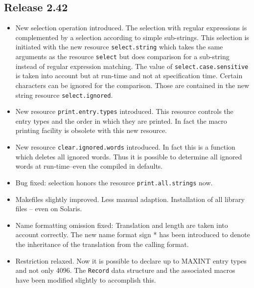 \documentclass[11pt,a4paper]{scrartcl}
\newcommand\rsc[1]{\texttt{#1}}
\newenvironment{Release}[2]{%
  \def\tmp{#2}%
  \section*{Release #1 \ifx\tmp\empty\else{\normalsize[#2]}\fi}
  \begin{itemize}
}{\end{itemize}}
\newenvironment{Fix}[1]{\item }{}
\newenvironment{New}[1]{\item }{}
\newenvironment{Update}[1]{\item }{}
\begin{document}
\begin{multicols}
 \begin{Release}{2.42}{}
  \begin{New}{gene}
    New selection operation introduced. The selection with regular expressions
    is complemented by a selection according to simple sub-strings. This
    selection is initiated with the new resource \rsc{select.string}
    which takes the same arguments as the resource \rsc{select} but
    does comparison for a sub-string instead of regular expression matching.
    The value of \rsc{select.case.sensitive} is taken into account but
    at run-time and not at specification time. Certain characters can be
    ignored for the comparison. Those are contained in the new string resource
    \rsc{select.ignored}.
  \end{New}
  \begin{New}{gene}
    New resource \rsc{print.entry.types} introduced. This resource
    controls the entry types and the order in which they are printed.
    In fact the macro printing facility is obsolete with this new
    resource.
  \end{New}
  \begin{New}{gene}
    New resource \rsc{clear.ignored.words} introduced. In fact this is
    a function which deletes all ignored words. Thus it is possible to
    determine all ignored words at run-time--even the compiled in
    defaults.
  \end{New}
  \begin{Fix}{gene}
    Bug fixed: selection honors the resource \rsc{print.all.strings}
    now.
  \end{Fix}
  \begin{Update}{gene}
    Makefiles slightly improved. Less manual adaption. Installation of all
    library files -- even on Solaris.
  \end{Update}
  \begin{Fix}{gene}
    Name formatting omission fixed: Translation and length are taken
    into account correctly. The new name format sign * has been
    introduced to denote the inheritance of the translation from the
    calling format.
  \end{Fix}
  \begin{Update}{gene}
    Restriction relaxed. Now it is possible to declare up to MAXINT
    entry types and not only 4096. The \verb|Record| data structure
    and the associated macros have been modified slightly to
    accomplish this.
  \end{Update}

\end{Release}
\end{multicols}
\end{document}
